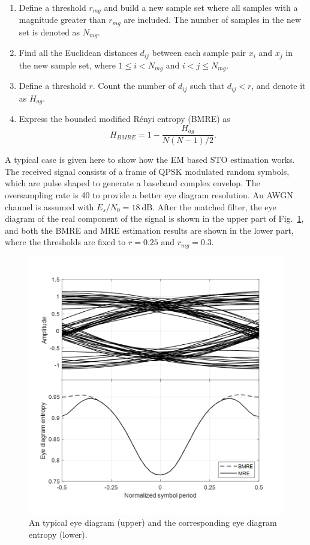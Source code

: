 \documentclass[12pt, draftclsnofoot, onecolumn]{IEEEtran}
\begin{document}
\begin{enumerate}
\item Define a threshold \(r_{mg}\) and build a new sample set where all samples with a magnitude greater than \(r_{mg}\) are included.
The number of samples in the new set is denoted as \(N_{mg}\).
\item Find all the Euclidean distances \(d_{ij}\) between each sample pair \(x_i\) and \(x_j\) in the new sample set, where \(1\le i<N_{mg}\) and \( i<j \le N_{mg}\). 
\item Define a threshold \(r\). Count the number of \(d_{ij}\) such that $d_{ij}<r$, and denote it as $H_{ag}$.
\item Express the bounded modified R\'enyi entropy (BMRE) as
\begin{equation}
H_{BMRE}= 1- \frac{ H_{ag}}{ N(N-1)/2}.
\label{eq:entorpy_ad2}
\end{equation}
\end{enumerate}



A typical case is given here to show how the EM based STO estimation works.
The received signal consists of a frame of QPSK modulated random symbols, 
which are pulse shaped to generate a baseband complex envelop.
The oversampling rate is 40 to provide a better eye diagram resolution.
An AWGN channel is assumed with $E_s/N_0 = 18~\text{dB}$. 
After the matched filter, the eye diagram of the real component of the signal is shown in the upper part of Fig.~\ref{fig:timing}, and both the BMRE and MRE estimation results are shown in the lower part,
where the thresholds are fixed to $r=0.25$ and \(r_{mg}=0.3\).


\begin{figure}[htbp]
\centering
\includegraphics[width=3.1 in]{pic/timing.png}
\caption{An typical eye diagram (upper) and the corresponding eye diagram entropy (lower).}
\label{fig:timing} 
\end{figure}
\end{document}
